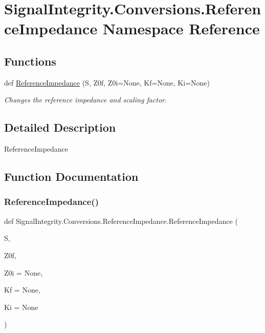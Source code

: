 \hypertarget{namespaceSignalIntegrity_1_1Conversions_1_1ReferenceImpedance}{}\section{Signal\+Integrity.\+Conversions.\+Reference\+Impedance Namespace Reference}
\label{namespaceSignalIntegrity_1_1Conversions_1_1ReferenceImpedance}
\subsection*{Functions}
\begin{DoxyCompactItemize}
\item 
def \hyperlink{namespaceSignalIntegrity_1_1Conversions_1_1ReferenceImpedance_afcf7f40859f27590f57b51a8b47e0cde}{Reference\+Impedance} (S, Z0f, Z0i=None, Kf=None, Ki=None)
\begin{DoxyCompactList}\small\item\em Changes the reference impedance and scaling factor. \end{DoxyCompactList}\end{DoxyCompactItemize}


\subsection{Detailed Description}
\begin{DoxyVerb}ReferenceImpedance\end{DoxyVerb}
 

\subsection{Function Documentation}
\mbox{\label{namespaceSignalIntegrity_1_1Conversions_1_1ReferenceImpedance_afcf7f40859f27590f57b51a8b47e0cde}} 
\subsubsection{\texorpdfstring{Reference\+Impedance()}{ReferenceImpedance()}}
{\footnotesize\ttfamily def Signal\+Integrity.\+Conversions.\+Reference\+Impedance.\+Reference\+Impedance (\begin{DoxyParamCaption}\item[{}]{S,  }\item[{}]{Z0f,  }\item[{}]{Z0i = {\ttfamily None},  }\item[{}]{Kf = {\ttfamily None},  }\item[{}]{Ki = {\ttfamily None} }\end{DoxyParamCaption})}



